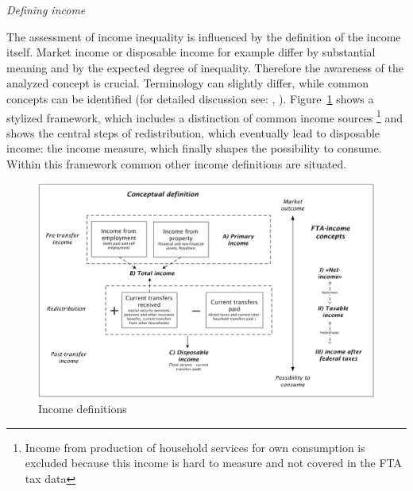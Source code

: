 \documentclass[twoside]{article}\usepackage[]{graphicx}\usepackage[]{color}
\makeatletter
\def\maxwidth{ %
  \ifdim\Gin@nat@width>\linewidth
    \linewidth
  \else
    \Gin@nat@width
  \fi
}
\makeatother
\begin{document}
\begin{multicols}{2}
\emph{Defining income}

The assessment of income inequality is influenced by the definition of the income itself. Market income or disposable income for example differ by substantial meaning and by the expected degree of inequality. Therefore the awareness of the analyzed concept is crucial. Terminology can slightly differ, while common concepts can be identified (for detailed discussion see: \citet[44]{oecd_oecd_2013}, \citet[24]{united_nations_canberra_2011}). Figure~\ref{fig:incdef} shows a stylized framework, which includes a distinction of common income sources \footnote{Income from production of household services for own consumption is excluded because this income is hard to measure and not covered in the FTA tax data} and shows the central steps of redistribution, which eventually lead to disposable income: the income measure, which finally shapes the possibility to consume. Within this framework common other income definitions are situated. 

\begin{figure}
\centering
\includegraphics[width=\maxwidth]{figure/income_definition}
\caption{Income definitions}
\label{fig:incdef}
\end{figure}




\end{multicols}
\end{document}
